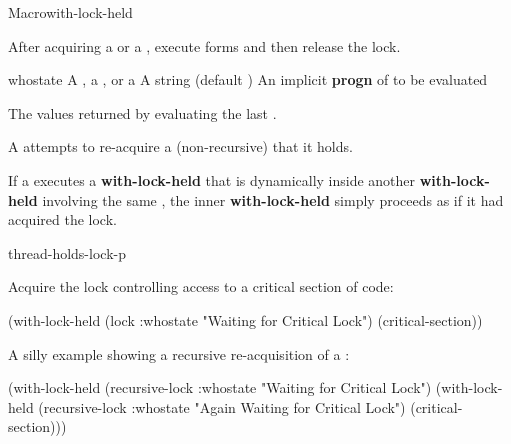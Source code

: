 
\begin{functiondoc}{Macro}{with-lock-held}{\code{(} 
    \code{)}
    \superstar{} 
    \returns{} \superstar}
%
%
%
%

\fnsyntax

\fnpurpose After acquiring a  or a ,
execute forms and then release the lock.

\fnpackage {}

\fnmodule {}

\fnargs
\begin{args}{whostate}
\arg[lock] A , a , or a 
\arg[whostate] A string (default )
\arg[forms] An implicit \textbf{progn} of  to be evaluated
\end{args}

\fnreturns The values returned by evaluating the last .

\fnerrors A  attempts to re-acquire a (non-recursive)
 that it holds.
  
\fndescription If a  executes a \textbf{with-lock-held}
that is dynamically inside another \textbf{with-lock-held} involving
the same , the inner \textbf{with-lock-held}
simply proceeds as if it had acquired the lock.

\begin{alsos}{thread-holds-lock-p}
\end{alsos}

\fnexamples
Acquire the lock controlling access to a critical section of code:
\begin{example}
  (with-lock-held (lock :whostate "Waiting for Critical Lock")
    (critical-section))
\end{example}

A silly example showing a recursive re-acquisition of a
:
\begin{example}
  (with-lock-held (recursive-lock :whostate "Waiting for Critical Lock")
    (with-lock-held (recursive-lock :whostate "Again Waiting for Critical Lock")
      (critical-section)))
\end{example}


\end{functiondoc}

